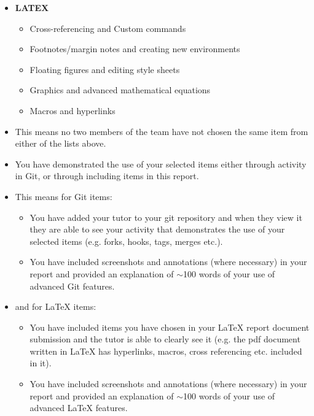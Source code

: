 \documentclass[a4paper, 11pt]{report}
\begin{document}
{{\begin{itemize}
\begin{itemize}
		\begin{itemize}
		\item Rebasing and Ignoring files
		\item Forking and Special files
		\item Resetting and Tags
		\item Reverting and Automated merges
		\item Hooks and Tags
		\end{itemize}
	\item \textbf{LATEX}
		\begin{itemize}
		\item Cross-referencing and Custom commands
		\item Footnotes/margin notes and creating new environments
		\item Floating figures and editing style sheets
		\item Graphics and advanced mathematical equations
		\item Macros and hyperlinks
		\end{itemize}
	\item This means no two members of the team have not chosen the same item from either of the lists above.
	\item You have demonstrated the use of your selected items either through activity in Git, or through including items in this report.
	\item This means for Git items:
		\begin{itemize}
		\item You have added your tutor to your git repository and when they view it they are able to see your activity that demonstrates the use of your selected items (e.g. forks, hooks, tags, merges etc.).
		\item You have included screenshots and annotations (where necessary) in your report and provided an explanation of $\sim$100 words of your use of advanced Git features.
		\end{itemize}
	\item and for LaTeX items:
		\begin{itemize}
		\item You have included items you have chosen in your LaTeX report document submission and the tutor is able to clearly see it (e.g. the pdf document written in LaTeX has hyperlinks, macros, cross referencing etc. included in it).
		\item You have included screenshots and annotations (where necessary) in your report and provided an explanation of $\sim$100 words of your use of advanced LaTeX features.

\end{itemize}
\end{itemize}
\end{itemize}}}
\end{document}
